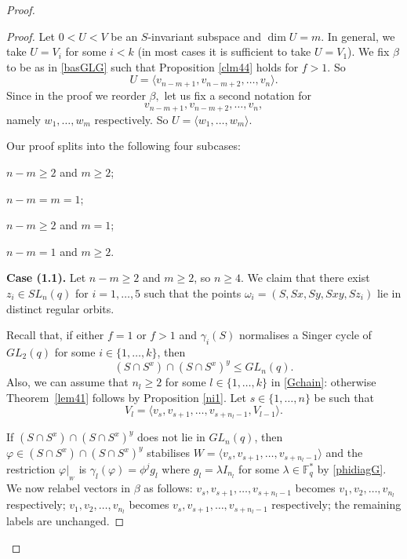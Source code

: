 \begin{proof}
\begin{proof}

Let $0<U <V$ be an $S$-invariant subspace and $\dim U=m.$ In general, we take $U=V_i$ for some $i<k$ (in most cases it is sufficient to take $U=V_1$). We fix $\beta$ to be as in \eqref{basGLG} such that Proposition \ref{clm44} holds for $f>1.$ So 
$$U = \langle v_{n-m+1}, v_{n-m+2}, \ldots, v_n \rangle.$$ Since in the proof we reorder $\beta,$ let us fix a second notation for  $$v_{n-m+1}, v_{n-m+2}, \ldots, v_n,$$ namely 
$w_1, \ldots, w_m$
respectively. So $U = \langle w_1, \ldots, w_m \rangle.$

  Our proof splits into the following four  subcases:
\begin{description}[before={\renewcommand\makelabel[1]{\bfseries ##1}}]
\item[{\bf Case (1.1)}] $n-m\ge 2 $ and $m \ge 2$;
\item[{\bf Case (1.2)}] $n-m=m=1$;
\item[{\bf Case (1.3)}] $n-m \ge 2$ and $m=1$;
\item[{\bf Case (1.4)}] $n-m=1$  and $m \ge 2$.
\end{description} 



{\bf Case (1.1).} Let $n-m\ge 2 $ and $m \ge 2$, so $n \ge 4$. We claim that there exist $z_i \in SL_n(q)$ for $i=1, \ldots, 5$ such that the points $\omega_i=(S,Sx,Sy,Sxy,Sz_i)$ lie in distinct regular orbits. 

 Recall that, if either $f=1$ or  $f>1$ and  $\gamma_i(S)$ normalises a Singer cycle of $GL_2(q)$ for some $i \in \{1, \ldots, k\}$, then $$(S \cap S^x) \cap (S \cap S^x)^y \le GL_n(q).$$ Also, we can assume that $n_l \ge 2$ for some $l \in \{1, \ldots, k\}$ in \eqref{Gchain}: otherwise Theorem~\ref{lem41} follows by Proposition \ref{ni1}. Let $s \in \{1, \ldots, n\}$ be such that $$V_l = \langle v_s, v_{s+1}, \ldots, v_{s+n_l-1}, V_{l-1} \rangle.$$

 If $(S \cap S^x) \cap (S \cap S^x)^y$ does not lie in $GL_n(q)$, then   $\varphi \in (S \cap S^x) \cap (S \cap S^x)^y$ stabilises $W=\langle v_s, v_{s+1}, \ldots, v_{s+n_l-1} \rangle$ and the restriction $\varphi|_{_{W}}$ is $\gamma_l(\varphi)=\phi^j g_l$ where $g_l =\lambda I_{n_l}$ for some $\lambda \in \mathbb{F}_q^*$ by \eqref{phidiagG}. We now relabel vectors in $\beta$ as follows: $v_s, v_{s+1}, \ldots, v_{s+n_l-1}$ becomes $v_1, v_{2}, \ldots, v_{n_l}$ respectively; $v_1, v_{2}, \ldots, v_{n_l}$  becomes $v_s, v_{s+1}, \ldots, v_{s+n_l-1}$  respectively;  the remaining labels are unchanged.




\end{proof}
\end{proof}
